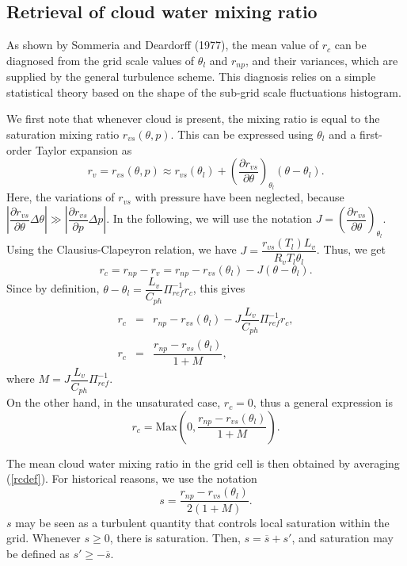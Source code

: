 \subsection{Retrieval of cloud water mixing ratio}

As shown by Sommeria and Deardorff (1977), the mean value of $r_c$ can
be diagnosed from the grid scale values of $\theta_{l}$ and $r_{np}$,
and their variances, which are supplied by the general turbulence scheme.
This diagnosis relies
on a simple statistical theory based on the shape of the sub-grid scale
fluctuations histogram.

We first note that whenever cloud is present, the mixing ratio is equal to
the saturation mixing ratio $r_{vs}(\theta,p)$. This can be expressed using
$\theta_l$ and a first-order Taylor expansion as
\begin{equation}
r_v = r_{vs} \left( \theta,p \right) \approx r_{vs}(\theta_l) +
(\dfrac {\partial r_{vs}} {\partial \theta})_{\theta_l}
(\theta-\theta_l).
\end{equation}
Here, the variations of $r_{vs}$ with pressure have been neglected, because
$|\dfrac {\partial r_{vs}} {\partial \theta}\Delta \theta| \gg
|\dfrac {\partial r_{vs}} {\partial p}\Delta p|$.
In the following, we will use the notation
$J= \left( \dfrac {\partial  r_{vs}} {\partial \theta} \right)_{\theta_l} $.
Using the Clausius-Clapeyron relation, we have
$J = \dfrac {r_{vs}(T_l) L_v} {R_v T_l \theta_l} $.
Thus, we get
\begin{equation}
r_c = r_{np} - r_v = r_{np} - r_{vs}(\theta_l)- J (\theta-\theta_l).
\end{equation}
Since by definition, $\theta-\theta_l=\dfrac{L_v}{C_{ph}}\Pi_{ref}^{-1}r_c$,
this gives
\begin{eqnarray}
r_c &=& r_{np}-r_{vs} (\theta_l)- J \dfrac{L_v}{C_{ph}}\Pi_{ref}^{-1}r_c, \\
r_c &=& \dfrac {r_{np}-r_{vs}(\theta_l)} {1+M},
\end{eqnarray}
where $ M= J \dfrac{L_v}{C_{ph}}\Pi_{ref}^{-1} $. \\

On the other hand, in the unsaturated case, $r_c = 0$, thus a
general expression is
\begin{equation} \label{rcdef}
r_c = \mbox{Max} \left(0,\dfrac {r_{np}-r_{vs}(\theta_l)} {1+M} \right).
\end{equation}

The mean cloud water mixing ratio in the grid cell is then obtained by
averaging (\ref{rcdef}). For historical reasons, we use the notation
\begin{equation}\label{eqn:s}
s = \dfrac {r_{np}-r_{vs}(\theta_l)} {2(1+M)}.
\end{equation}
$s$ may be seen as a turbulent quantity that controls local saturation within
the grid. Whenever $s \ge 0$, there is saturation. Then,
$s=\overline{s} + s'$, and saturation may be defined as $s'\ge -\overline{s}$.

